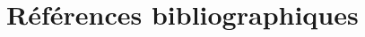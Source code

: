 \documentclass[a4paper, 12pt,twoside]{article}
\begin{document}

\section{Références bibliographiques}
        {
        \renewcommand{\section}[2]{} %
        \nocite{*} %
        
        
        }
        
    
\end{document}
